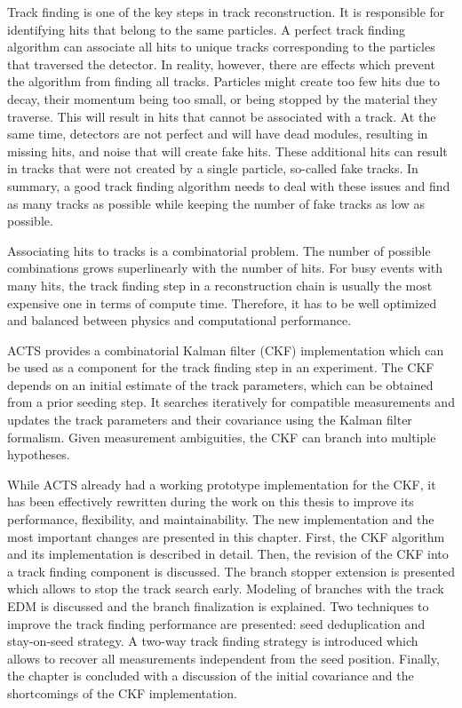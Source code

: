 Track finding is one of the key steps in track reconstruction. It is responsible for identifying hits that belong to the same particles. A perfect track finding algorithm can associate all hits to unique tracks corresponding to the particles that traversed the detector. In reality, however, there are effects which prevent the algorithm from finding all tracks. Particles might create too few hits due to decay, their momentum being too small, or being stopped by the material they traverse. This will result in hits that cannot be associated with a track. At the same time, detectors are not perfect and will have dead modules, resulting in missing hits, and noise that will create fake hits. These additional hits can result in tracks that were not created by a single particle, so-called fake tracks. In summary, a good track finding algorithm needs to deal with these issues and find as many tracks as possible while keeping the number of fake tracks as low as possible.

Associating hits to tracks is a combinatorial problem. The number of possible combinations grows superlinearly with the number of hits. For busy events with many hits, the track finding step in a reconstruction chain is usually the most expensive one in terms of compute time. Therefore, it has to be well optimized and balanced between physics and computational performance.

ACTS provides a combinatorial Kalman filter (CKF) implementation which can be used as a component for the track finding step in an experiment. The CKF depends on an initial estimate of the track parameters, which can be obtained from a prior seeding step. It searches iteratively for compatible measurements and updates the track parameters and their covariance using the Kalman filter formalism. Given measurement ambiguities, the CKF can branch into multiple hypotheses.

While ACTS already had a working prototype implementation for the CKF, it has been effectively rewritten during the work on this thesis to improve its performance, flexibility, and maintainability. The new implementation and the most important changes are presented in this chapter. First, the CKF algorithm and its implementation is described in detail. Then, the revision of the CKF into a track finding component is discussed. The branch stopper extension is presented which allows to stop the track search early. Modeling of branches with the track EDM is discussed and the branch finalization is explained. Two techniques to improve the track finding performance are presented: seed deduplication and stay-on-seed strategy. A two-way track finding strategy is introduced which allows to recover all measurements independent from the seed position. Finally, the chapter is concluded with a discussion of the initial covariance and the shortcomings of the CKF implementation.

